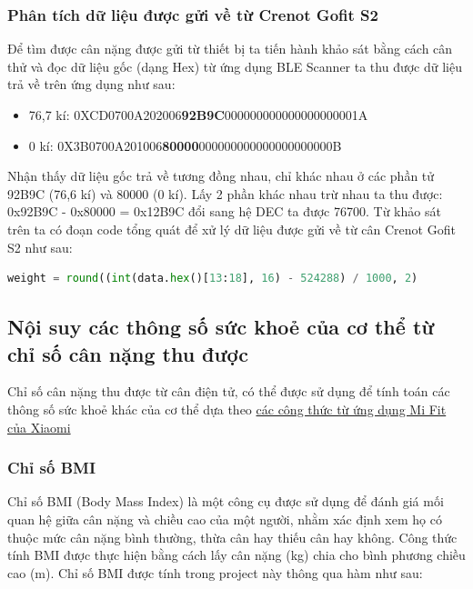 \subsubsection{Phân tích dữ liệu được gửi về từ Crenot Gofit S2}

Để tìm được cân nặng được gửi từ thiết bị ta tiến hành khảo sát bằng cách cân thử và đọc dữ liệu gốc (dạng Hex) từ ứng dụng BLE Scanner ta thu được dữ liệu trả về trên ứng dụng như sau:

\begin{itemize}
    \item 76,7 kí: 0XCD0700A202006\textbf{92B9C}000000000000000000001A
    \item 0 kí: 0X3B0700A201006\textbf{80000}000000000000000000000B
\end{itemize}

Nhận thấy dữ liệu gốc trả về tương đồng nhau, chỉ khác nhau ở các phần tử 92B9C (76,6 kí) và 80000 (0 kí). Lấy 2 phần khác nhau trừ nhau ta thu được: 0x92B9C - 0x80000 = 0x12B9C đổi sang hệ DEC ta được 76700. Từ khảo sát trên ta có đoạn code tổng quát để xử lý dữ liệu được gửi về từ cân Crenot Gofit S2 như sau:

\begin{lstlisting}[language=python,caption={Code phân tích dữ liệu cân nặng được gửi về từ cân Crenot Gofit S2}]
weight = round((int(data.hex()[13:18], 16) - 524288) / 1000, 2)
\end{lstlisting}

\subsection{Nội suy các thông số sức khoẻ của cơ thể từ chỉ số cân nặng thu được}
Chỉ số cân nặng thu được từ cân điện tử, có thể được sử dụng để tính toán các thông số sức khoẻ khác của cơ thể dựa theo \href{https://github.com/lolouk44/xiaomi_mi_scale}{các công thức từ ứng dụng Mi Fit của Xiaomi}

\subsubsection{Chỉ số BMI}
Chỉ số BMI (Body Mass Index) là một công cụ được sử dụng để đánh giá mối quan hệ giữa cân nặng và chiều cao của một người, nhằm xác định xem họ có thuộc mức cân nặng bình thường, thừa cân hay thiếu cân hay không. Công thức tính BMI được thực hiện bằng cách lấy cân nặng (kg) chia cho bình phương chiều cao (m). Chỉ số BMI được tính trong project này thông qua hàm như sau:

